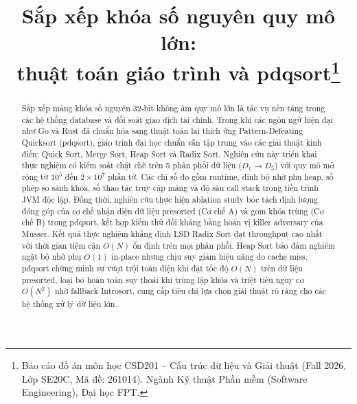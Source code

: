 \documentclass[conference]{IEEEtran}
\begin{document}

\title{\LARGE\bfseries Sắp xếp khóa số nguyên quy mô lớn:\\thuật toán giáo trình và pdqsort\thanks{Báo cáo đồ án môn học CSD201 -- Cấu trúc dữ liệu và Giải thuật (Fall 2026, Lớp SE20C, Mã đề: 261014). Ngành Kỹ thuật Phần mềm (Software Engineering), Đại học FPT.}
}

\author{
}

\maketitle


\begin{abstract}
Sắp xếp mảng khóa số nguyên 32-bit không âm quy mô lớn là tác vụ nền tảng trong các hệ thống database và đối soát giao dịch tài chính. Trong khi các ngôn ngữ hiện đại như Go và Rust đã chuẩn hóa sang thuật toán lai thích ứng Pattern-Defeating Quicksort (pdqsort), giáo trình đại học chuẩn vẫn tập trung vào các giải thuật kinh điển: Quick Sort, Merge Sort, Heap Sort và Radix Sort. Nghiên cứu này triển khai thực nghiệm có kiểm soát chặt chẽ trên 5 phân phối dữ liệu ($D_1 \to D_5$) với quy mô mở rộng từ $10^5$ đến $2\times 10^7$ phần tử. Các chỉ số đo gồm runtime, đỉnh bộ nhớ phụ heap, số phép so sánh khóa, số thao tác truy cập mảng và độ sâu call stack trong tiến trình JVM độc lập. Đồng thời, nghiên cứu thực hiện ablation study bóc tách định lượng đóng góp của cơ chế nhận diện dữ liệu presorted (Cơ chế A) và gom khóa trùng (Cơ chế B) trong pdqsort, kết hợp kiểm thử đối kháng bằng hoán vị killer adversary của Musser. Kết quả thực nghiệm khẳng định LSD Radix Sort đạt throughput cao nhất với thời gian tiệm cận $O(N)$ ổn định trên mọi phân phối. Heap Sort bảo đảm nghiêm ngặt bộ nhớ phụ $O(1)$ in-place nhưng chịu suy giảm hiệu năng do cache miss. pdqsort chứng minh sự vượt trội toàn diện khi đạt tốc độ $O(N)$ trên dữ liệu presorted, loại bỏ hoàn toàn suy thoái khi trùng lặp khóa và triệt tiêu nguy cơ $O(N^2)$ nhờ fallback Introsort, cung cấp tiêu chí lựa chọn giải thuật rõ ràng cho các hệ thống xử lý dữ liệu lớn.
\end{abstract}
\end{document}
